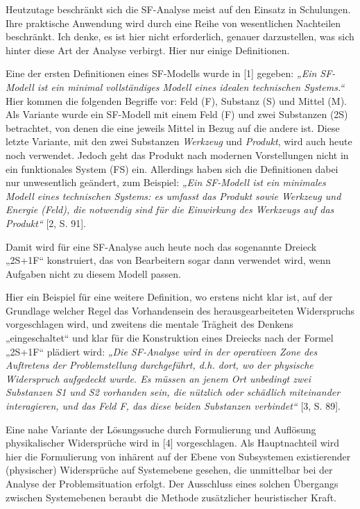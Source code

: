 \documentclass[11pt,a4paper]{article}
\begin{document}
Heutzutage beschränkt sich die SF-Analyse meist auf den Einsatz in Schulungen.
Ihre praktische Anwendung wird durch eine Reihe von wesentlichen Nachteilen
beschränkt. Ich denke, es ist hier nicht erforderlich, genauer darzustellen,
was sich hinter diese Art der Analyse verbirgt. Hier nur einige Definitionen.

Eine der ersten Definitionen eines SF-Modells wurde in [1] gegeben: \emph{„Ein
  SF-Modell ist ein minimal vollständiges Modell eines idealen technischen
  Systems.“} Hier kommen die folgenden Begriffe vor: Feld (F), Substanz (S)
und Mittel (M). Als Variante wurde ein SF-Modell mit einem Feld (F) und zwei
Substanzen (2S) betrachtet, von denen die eine jeweils Mittel in Bezug auf die
andere ist. Diese letzte Variante, mit den zwei Substanzen \emph{Werkzeug} und
\emph{Produkt}, wird auch heute noch verwendet. Jedoch geht das Produkt nach
modernen Vorstellungen nicht in ein funktionales System (FS) ein. Allerdings
haben sich die Definitionen dabei nur unwesentlich geändert, zum Beispiel:
\emph{„Ein SF-Modell ist ein minimales Modell eines technischen Systems: es
  umfasst das Produkt sowie Werkzeug und Energie (Feld), die notwendig sind
  für die Einwirkung des Werkzeugs auf das Produkt“} [2, S. 91].

Damit wird für eine SF-Analyse auch heute noch das sogenannte Dreieck „2S+1F“
konstruiert, das von Bearbeitern sogar dann verwendet wird, wenn Aufgaben
nicht zu diesem Modell passen.

Hier ein Beispiel für eine weitere Definition, wo erstens nicht klar ist, auf
der Grundlage welcher Regel das Vorhandensein des herausgearbeiteten
Widerspruchs vorgeschlagen wird, und zweitens die mentale Trägheit des Denkens
„eingeschaltet“ und klar für die Konstruktion eines Dreiecks nach der Formel
„2S+1F“ plädiert wird: \emph{„Die SF-Analyse wird in der operativen Zone des
  Auftretens der Problemstellung durchgeführt, d.h. dort, wo der physische
  Widerspruch aufgedeckt wurde. Es müssen an jenem Ort unbedingt zwei
  Substanzen S1 und S2 vorhanden sein, die nützlich oder schädlich miteinander
  interagieren, und das Feld F, das diese beiden Substanzen verbindet“} [3,
  S. 89].

Eine nahe Variante der Lösungssuche durch Formulierung und Auflösung
physikalischer Widersprüche wird in [4] vorgeschlagen. Als Hauptnachteil wird
hier die Formulierung von inhärent auf der Ebene von Subsystemen existierender
(physischer) Widersprüche auf Systemebene gesehen, die unmittelbar bei der
Analyse der Problemsituation erfolgt.  Der Ausschluss eines solchen Übergangs
zwischen Systemebenen beraubt die Methode zusätzlicher heuristischer Kraft.
\end{document}
